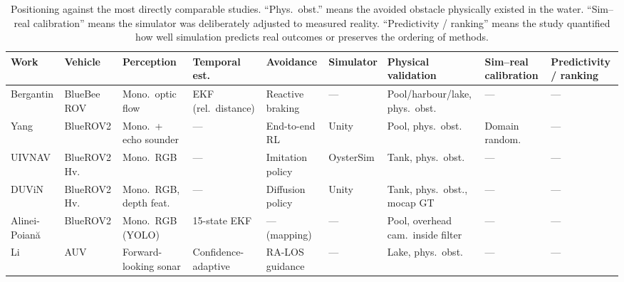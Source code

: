 \begin{table}[t]
\centering
\caption{Positioning against the most directly comparable studies.
``Phys.\ obst.'' means the avoided obstacle physically existed in the water.
``Sim--real calibration'' means the simulator was deliberately adjusted to
measured reality. ``Predictivity / ranking'' means the study quantified how
well simulation predicts real outcomes or preserves the ordering of methods.}
\label{tab:related}
\tiny
\setlength{\tabcolsep}{2pt}
\renewcommand{\arraystretch}{1.25}
\begin{tabular}{@{}
  p{0.56in} p{0.54in} p{0.80in} p{0.66in} p{0.62in}
  p{0.66in} p{0.92in} p{0.72in} p{0.70in}@{}}
\toprule
\textbf{Work} & \textbf{Vehicle} & \textbf{Perception} &
\textbf{Temporal est.} & \textbf{Avoidance} & \textbf{Simulator} &
\textbf{Physical validation} & \textbf{Sim--real calibration} &
\textbf{Predictivity / ranking} \\
\midrule
Bergantin \cite{bergantin2024realtime}
  & BlueBee ROV & Mono.\ optic flow & EKF (rel.\ distance)
  & Reactive braking & --- & Pool/harbour/lake, phys.\ obst.\ & --- & --- \\
Yang \cite{yang2022monocula}
  & BlueROV2 & Mono.\ + echo sounder & ---
  & End-to-end RL & Unity & Pool, phys.\ obst.\ & Domain random.\ & --- \\
UIVNAV \cite{lin2024uivnavun}
  & BlueROV2 Hv.\ & Mono.\ RGB & ---
  & Imitation policy & OysterSim & Tank, phys.\ obst.\ & --- & --- \\
DUViN \cite{yang2025duvindif}
  & BlueROV2 Hv.\ & Mono.\ RGB, depth feat.\ & ---
  & Diffusion policy & Unity & Tank, phys.\ obst., mocap GT & --- & --- \\
Alinei-Poian\u{a} \cite{alineipoiana2024abluerov}
  & BlueROV2 & Mono.\ RGB (YOLO) & 15-state EKF
  & --- (mapping) & --- & Pool, overhead cam.\ inside filter & --- & --- \\
Li \cite{li2026underwat}
  & AUV & Forward-looking sonar & Confidence-adaptive
  & RA-LOS guidance & --- & Lake, phys.\ obst.\ & --- & --- \\

\end{tabular}
\end{table}
